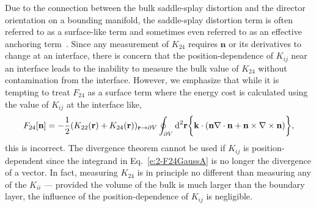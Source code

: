 Due to the connection between the bulk saddle-splay distortion and the director orientation on a bounding manifold, the saddle-splay distortion term is often referred to as a surface-like term and sometimes even referred to as an effective anchoring term~\cite{RN206,RN33,RN194,RN58,RN57,RN151}.
Since any measurement of $K_{24}$ requires $\mathbf{n}$ or its derivatives to change at an interface, there is concern that the position-dependence of $K_{ij}$ near an interface leads to the inability to measure the bulk value of $K_{24}$ without contamination from the interface.
However, we emphasize that while it is tempting to treat $F_{24}$ as a surface term where the energy cost is calculated using the value of $K_{ij}$ at the interface like,
\begin{equation}
  F_{24}[\mathbf{n}] = - \frac{1}{2}(K_{22}(\mathbf{r}) + K_{24}(\mathbf{r}))_{\mathbf{r} \rightarrow \partial V} \oint_{\partial V} \textup{d}^2  \mathbf{r} \bigg \{   \mathbf{k} \cdot (\mathbf{n}\nabla \cdot \mathbf{n} + \mathbf{n} \times \nabla \times \mathbf{n}) \bigg \},
\end{equation}
this is incorrect.
The divergence theorem cannot be used if $K_{ij}$ is position-dependent since the integrand in Eq.~\ref{e:2-F24GaussA} is no longer the divergence of a vector.
In fact, measuring $K_{24}$ is in principle no different than measuring any of the $K_{ii}$ --- provided the volume of the bulk is much larger than the boundary layer, the influence of the position-dependence of $K_{ij}$ is negligible.

